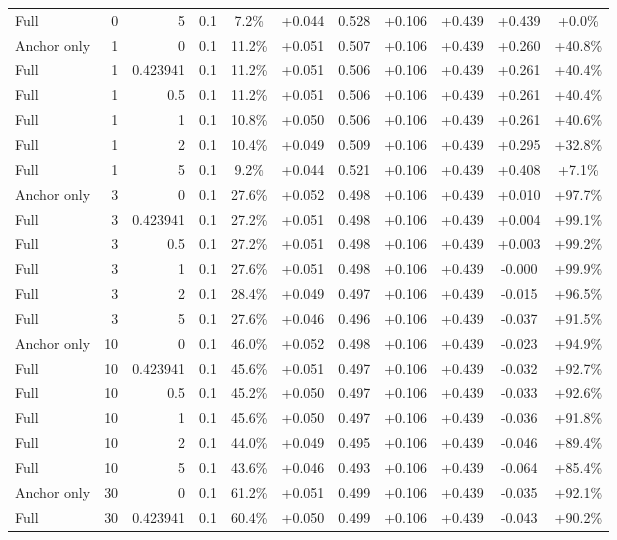 \begin{table}[htbp]
\begin{tabular}{lrrrccccccc}
Full & 0 & 5 & 0.1 & 7.2\% & +0.044 & 0.528 & +0.106 & +0.439 & +0.439 & +0.0\% \\
Anchor only & 1 & 0 & 0.1 & 11.2\% & +0.051 & 0.507 & +0.106 & +0.439 & +0.260 & +40.8\% \\
Full & 1 & 0.423941 & 0.1 & 11.2\% & +0.051 & 0.506 & +0.106 & +0.439 & +0.261 & +40.4\% \\
Full & 1 & 0.5 & 0.1 & 11.2\% & +0.051 & 0.506 & +0.106 & +0.439 & +0.261 & +40.4\% \\
Full & 1 & 1 & 0.1 & 10.8\% & +0.050 & 0.506 & +0.106 & +0.439 & +0.261 & +40.6\% \\
Full & 1 & 2 & 0.1 & 10.4\% & +0.049 & 0.509 & +0.106 & +0.439 & +0.295 & +32.8\% \\
Full & 1 & 5 & 0.1 & 9.2\% & +0.044 & 0.521 & +0.106 & +0.439 & +0.408 & +7.1\% \\
Anchor only & 3 & 0 & 0.1 & 27.6\% & +0.052 & 0.498 & +0.106 & +0.439 & +0.010 & +97.7\% \\
Full & 3 & 0.423941 & 0.1 & 27.2\% & +0.051 & 0.498 & +0.106 & +0.439 & +0.004 & +99.1\% \\
Full & 3 & 0.5 & 0.1 & 27.2\% & +0.051 & 0.498 & +0.106 & +0.439 & +0.003 & +99.2\% \\
Full & 3 & 1 & 0.1 & 27.6\% & +0.051 & 0.498 & +0.106 & +0.439 & -0.000 & +99.9\% \\
Full & 3 & 2 & 0.1 & 28.4\% & +0.049 & 0.497 & +0.106 & +0.439 & -0.015 & +96.5\% \\
Full & 3 & 5 & 0.1 & 27.6\% & +0.046 & 0.496 & +0.106 & +0.439 & -0.037 & +91.5\% \\
Anchor only & 10 & 0 & 0.1 & 46.0\% & +0.052 & 0.498 & +0.106 & +0.439 & -0.023 & +94.9\% \\
Full & 10 & 0.423941 & 0.1 & 45.6\% & +0.051 & 0.497 & +0.106 & +0.439 & -0.032 & +92.7\% \\
Full & 10 & 0.5 & 0.1 & 45.2\% & +0.050 & 0.497 & +0.106 & +0.439 & -0.033 & +92.6\% \\
Full & 10 & 1 & 0.1 & 45.6\% & +0.050 & 0.497 & +0.106 & +0.439 & -0.036 & +91.8\% \\
Full & 10 & 2 & 0.1 & 44.0\% & +0.049 & 0.495 & +0.106 & +0.439 & -0.046 & +89.4\% \\
Full & 10 & 5 & 0.1 & 43.6\% & +0.046 & 0.493 & +0.106 & +0.439 & -0.064 & +85.4\% \\
Anchor only & 30 & 0 & 0.1 & 61.2\% & +0.051 & 0.499 & +0.106 & +0.439 & -0.035 & +92.1\% \\
Full & 30 & 0.423941 & 0.1 & 60.4\% & +0.050 & 0.499 & +0.106 & +0.439 & -0.043 & +90.2\% \\

\end{tabular}
\end{table}
